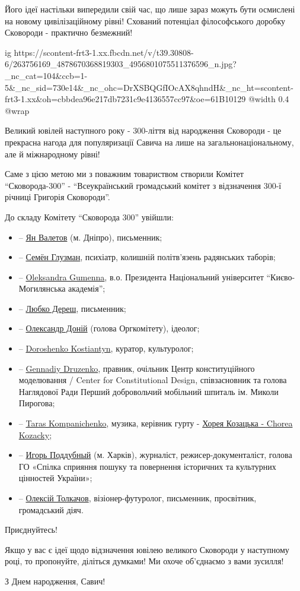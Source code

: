 Його ідеї настільки випередили свій час, що лише зараз можуть бути осмислені на
новому цивілізаційному рівні! Схований потенціал філософського доробку
Сковороди - практично безмежний!

\ifcmt
  ig https://scontent-frt3-1.xx.fbcdn.net/v/t39.30808-6/263756169_4878670368819303_4956801075511376596_n.jpg?_nc_cat=104&ccb=1-5&_nc_sid=730e14&_nc_ohc=DrXSBQGfIOcAX8qhndH&_nc_ht=scontent-frt3-1.xx&oh=cbbdea96e217db7231c9e4136557cc97&oe=61B10129
  @width 0.4
  @wrap 
\fi

Великий ювілей наступного року - 300-ліття від народження Сковороди - це
прекрасна нагода для популяризації Савича на лише на загальнонаціональному, але
й міжнародному рівні!

Саме з цією метою ми з поважним товариством створили Комітет \enquote{Сковорода-300} -
\enquote{Всеукраїнський громадський комітет з відзначення 300-ї річниці Григорія
Сковороди}.

До складу Комітету \enquote{Сковорода 300} увійшли:

\begin{itemize}
  \item – \href{https://www.facebook.com/ian.valietov}{Ян Валетов} (м. Дніпро), письменник;
  \item – \href{https://www.facebook.com/profile.php?id=100020629927113}{Семён Глузман}, психіатр, колишній політв’язень радянських таборів;
  \item – \href{https://www.facebook.com/profile.php?id=100001035721714}{Oleksandra Gumenna}, в.о. Президента Національний університет \enquote{Києво-Могилянська академія};
  \item – \href{https://www.facebook.com/lyubko.deresh}{Любко Дереш}, письменник;
  \item – \href{https://www.facebook.com/oles.doniy}{Олександр Доній} (голова Оргкомітету), ідеолог;
  \item – \href{https://www.facebook.com/doroshenko.kostyantyn}{Doroshenko Kostiantyn}, куратор, культуролог;
  \item – \href{https://www.facebook.com/gennadiy.druzenko}{Gennadiy Druzenko}, правник, очільник Центр конституційного моделювання / Center for Constitutional Design, співзасновник та голова Наглядової Ради Перший добровольчий мобільний шпиталь ім. Миколи Пирогова; 
  \item – \href{https://www.facebook.com/taras.kompanichenko}{Taras Kompanichenko}, музика, керівник гурту - 
  \href{https://www.facebook.com/Хорея-Козацька-Chorea-Kozacky-173908926023379/}{Хорея Козацька - Chorea Kozacky}; 
  \item – \href{https://www.facebook.com/piddubniy.igor}{Игорь Поддубный} (м. Харків), журналіст, режисер-документаліст, голова ГО «Спілка сприяння пошуку та повернення історичних та культурних цінностей України»; 
  \item – \href{https://www.facebook.com/oleksiy.tolkachov}{Олексій Толкачов}, візіонер-футуролог, письменник, просвітник, громадський діяч.
\end{itemize}

Приєднуйтесь! 

Якщо у вас є ідеї щодо відзначення ювілею великого Сковороди у наступному році,
то пропонуйте, діліться думками! Ми охоче об'єднаємо з вами зусилля!

З Днем народження, Савич!
